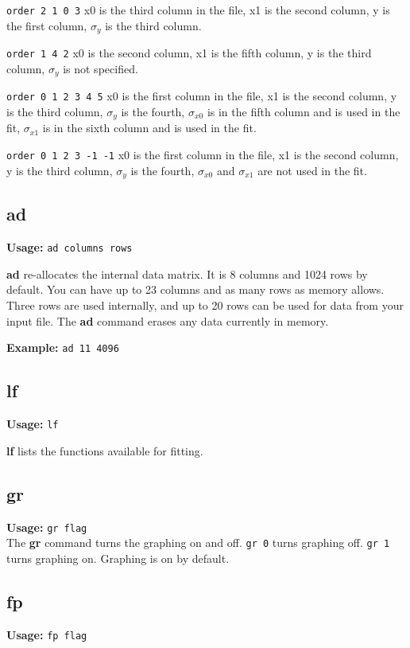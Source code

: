  {\tt order 2 1 0 3}  x0 is the third column in the file, x1 is
 the second column, y is the first column, $\sigma_y$ is the
 third column.

 {\tt order 1 4 2} x0 is the second column, x1 is the fifth
 column, y is the third column, $\sigma_y$ is not specified.

 {\tt order 0 1 2 3 4 5} x0 is the first column in the file, x1
 is the second column, y is the third column, $\sigma_y$ is the
 fourth, $\sigma_{x0}$ is in the fifth column and is used in the
 fit, $\sigma_{x1}$ is in the sixth column and is used in the fit.

 {\tt order 0 1 2 3 -1 -1} x0 is the first column in the file,
 x1 is the second column, y is the third column, $\sigma_y$ is the
 fourth, $\sigma_{x0}$ and $\sigma_{x1}$ are not used in the fit.

\subsection{ad}     {\bf Usage: } {\tt  ad columns rows}

        {\bf ad} re-allocates the internal data matrix.  It is 8
 columns and 1024 rows by default.  You can have up to 23
 columns and as many rows as memory allows.  Three rows are
 used internally, and up to 20 rows can be used for data
 from your input file.  The {\bf ad} command erases any data
 currently in memory.

        {\bf Example: } {\tt  ad 11 4096}

\subsection{lf}     {\bf Usage: } {\tt  lf}

        {\bf lf} lists the functions available for fitting.

\subsection{gr}     {\bf Usage: } {\tt  gr flag} \\

        The {\bf gr} command turns the graphing on and off.  {\tt gr 0}
 turns graphing off.  {\tt gr 1} turns graphing on.  Graphing is
 on by default.

\subsection{fp}     {\bf Usage: } {\tt  fp flag} \\

